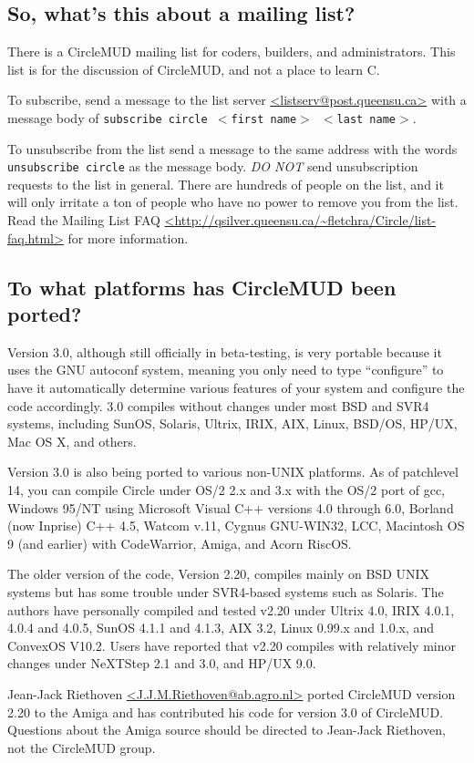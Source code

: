 \documentclass[11pt]{article}
\begin{document}
\subsection{So, what's this about a mailing list?}\label{mailinglist}
There is a CircleMUD mailing list for coders, builders, and administrators.  This list is for the discussion of CircleMUD, and not a place to learn C.
\par
To subscribe, send a message to the list server \url{<listserv@post.queensu.ca>} with a message body of \texttt{subscribe circle $<$first name$>$ $<$last name$>$}.
\par
To unsubscribe from the list send a message to the same address with the words \texttt{unsubscribe circle} as the message body. {\em DO NOT} send unsubscription requests to the list in general.  There are hundreds of people on the list, and it will only irritate a ton of people who have no power to remove you from the list.  Read the Mailing List FAQ \url{<http://qsilver.queensu.ca/~fletchra/Circle/list-faq.html>} for more information.

\subsection{To what platforms has CircleMUD been ported?}
Version 3.0, although still officially in beta-testing, is very portable because it uses the GNU autoconf system, meaning you only need to type ``configure'' to have it automatically determine various features of your system and configure the code accordingly. 3.0 compiles without changes under most BSD and SVR4 systems, including SunOS, Solaris, Ultrix, IRIX, AIX, Linux, BSD/OS, HP/UX, Mac OS X, and others.
\par
Version 3.0 is also being ported to various non-UNIX platforms.  As of patchlevel 14, you can compile Circle under OS/2 2.x and 3.x with the OS/2 port of gcc, Windows 95/NT using Microsoft Visual C++ versions 4.0 through 6.0, Borland (now Inprise) C++ 4.5, Watcom v.11, Cygnus GNU-WIN32, LCC, Macintosh OS 9 (and earlier) with CodeWarrior, Amiga, and Acorn RiscOS.
\par
The older version of the code, Version 2.20, compiles mainly on BSD UNIX systems but has some trouble under SVR4-based systems such as Solaris.  The authors have personally compiled and tested v2.20 under Ultrix 4.0, IRIX 4.0.1, 4.0.4 and 4.0.5, SunOS 4.1.1 and 4.1.3, AIX 3.2, Linux 0.99.x and 1.0.x, and ConvexOS V10.2.  Users have reported that v2.20 compiles with relatively minor changes under NeXTStep 2.1 and 3.0, and HP/UX 9.0.
\par
Jean-Jack Riethoven \url{<J.J.M.Riethoven@ab.agro.nl>} ported CircleMUD version 2.20 to the Amiga and has contributed his code for version 3.0 of CircleMUD.  Questions about the Amiga source should be directed to Jean-Jack Riethoven, not the CircleMUD group.
\end{document}
